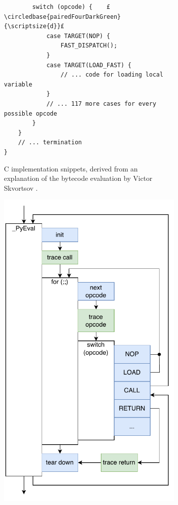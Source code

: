 \begin{figure}[H]
\begin{subfigure}[b]{0.65\textwidth}
\begin{verbatim}
        switch (opcode) {    £\circledbase{pairedFourDarkGreen}{\scriptsize{d}}£
            case TARGET(NOP) {
                FAST_DISPATCH();
            }
            case TARGET(LOAD_FAST) {
                // ... code for loading local variable
            }
            // ... 117 more cases for every possible opcode
        }
    }
    // ... termination
}
        \end{verbatim}
        \captionsetup{name=Listing}
        \caption{C implementation snippets, derived from an explanation of the bytecode evaluation by Victor Skvortsov \cite{victorskvortsovPythonScenes42020}.}
        \label{listing:cpython-evaluation-overview-code}
    \end{subfigure}
    \hfill
    \begin{subfigure}[b]{0.3\textwidth}
       \centering
       \includegraphics[width=\textwidth]{images/profiling_bytecode/python_eval.drawio.pdf}

\end{subfigure}
\end{figure}
